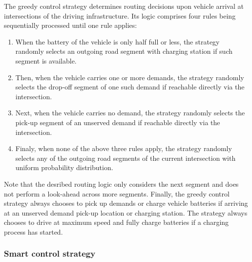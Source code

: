\documentclass[a4paper,twoside]{article}
\begin{document}
	The greedy control strategy determines routing decisions upon vehicle arrival at intersections of the driving infrastructure.
	Its logic comprises four rules being sequentially processed until one rule applies:
	\begin{enumerate}
		\item When the battery of the vehicle is only half full or less, the strategy randomly selects an outgoing road segment with charging station if such segment is available.
		\item Then, when the vehicle carries one or more demands, the strategy randomly selects the drop-off segment of one such demand if reachable directly via the intersection.
		\item Next, when the vehicle carries no demand, the strategy randomly selects the pick-up segment of an unserved demand if reachable directly via the intersection.
		\item Finaly, when none of the above three rules apply, the strategy randomly selects any of the outgoing road segments of the current intersection with uniform probability distribution.
	\end{enumerate}
	Note that the desribed routing logic only considers the next segment and does not perform a look-ahead across more segments.
	Finally, the greedy control strategy always chooses to pick up demands or charge vehicle batteries if arriving at an unserved demand pick-up location or charging station.
	The strategy always chooses to drive at maximum speed and fully charge batteries if a charging process has started.
	
	\subsubsection*{Smart control strategy}
	\label{sec:controller-smart}
\end{document}
